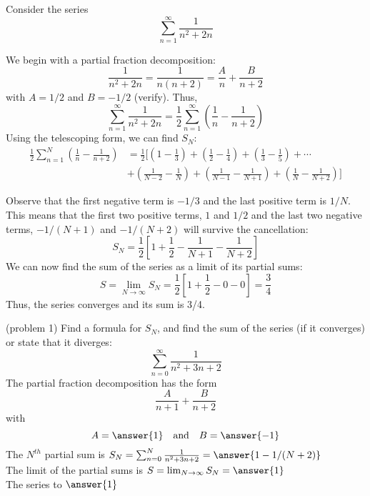 \documentclass[handout]{ximera}
\begin{document}
\begin{example}[example 2]
Consider the series
\[
\sum_{n=1}^\infty \frac{1}{n^2 +2n}
\]

We begin with a partial fraction decomposition:
\[
\frac{1}{n^2 + 2n} = \frac{1}{n(n+2)} = \frac{A}{n} + \frac{B}{n+2}
\]
with $A = 1/2$ and $B=-1/2$ (verify). Thus,
\[
\sum_{n=1}^\infty \frac{1}{n^2 + 2n}  = \frac12 \sum_{n=1}^\infty \left( \frac{1}{n} - \frac{1}{n+2} \right)
\]
Using the telescoping form, we can find $S_N$:
\begin{align*}
 \frac12 \sum_{n=1}^N  \left(\frac{1}{n}-\frac{1}{n+2}\right) &= \frac12 \Bigg[\left(1 - \frac13 \right) + \left(\frac12 - \frac14 \right) 
 + \left(\frac13 - \frac15 \right) + \cdots \\
 & + \left(\frac{1}{N-2} - \frac{1}{N} \right) +\left(\frac{1}{N-1} - \frac{1}{N+1} \right) +\left(\frac{1}{N} - \frac{1}{N+2} \right) \Bigg]
\end{align*}

Observe that the first negative term is $-1/3$ and the last positive term is $1/N$. This means that the first two positive terms, 
$1$ and $1/2$ and the last two negative terms, $-1/(N+1)$ 
and $-1/(N+2)$  will survive the cancellation:
\[
S_N = \frac12 \left[ 1 + \frac12 - \frac{1}{N+1} - \frac{1}{N+2}\right]
\]
We can now find the sum of the series as a limit of its partial sums:
\[
S  = \lim_{N\to \infty} S_N = \frac12 \left[1 + \frac12 - 0- 0\right] =  \frac34
\]
Thus, the series converges and its sum is 3/4.
\end{example}



\begin{problem}(problem 1)
Find a formula for $S_N$, and find the sum of the series (if it converges) or state that it diverges:
\[
\sum_{n=0}^\infty \frac{1}{n^2 + 3n + 2}
\]
The partial fraction decomposition has the form
\[
\frac{A}{n+1} + \frac{B}{n+2}
\]
with 
\[
A = \answer{1} \quad \mbox{and} \quad B = \answer{-1}
\]
The $N^{th}$ partial sum is  $S_N = \sum_{n=0}^N \frac{1}{n^2 + 3n + 2} = \answer{1 - 1/(N+2)}$\\
The limit of the partial sums is $S = \lim_{N\to \infty}S_N = \answer{1}$\\
The series  to $\answer{1}$

\end{problem}
\end{document}
